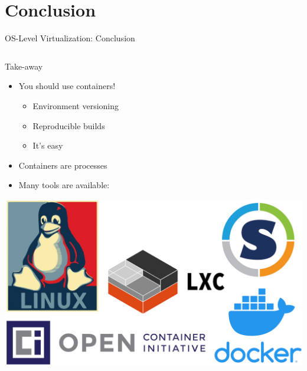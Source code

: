 \documentclass[10pt, compress, aspectratio=169, xcolor={table,usenames,dvipsnames}]{beamer}
\begin{document}
\section{Conclusion}
\label{sec:org249d7a5}
\begin{frame}[label={sec:org422efed}]{OS-Level Virtualization: Conclusion}
\begin{columns}
\begin{column}{0.4\columnwidth}
\begin{block}{Take-away}
\begin{itemize}
\item You should \alert{use containers}!
\begin{itemize}
\item Environment versioning
\item Reproducible builds
\item It's \alert{easy}
\end{itemize}
\item Containers are \alert{processes}
\item Many \alert{tools} are available:
\end{itemize}

\begin{center}
\includegraphics[width=.8\columnwidth]{../../img/containers.jpg}
\end{center}
\end{block}
\end{column}


\end{columns}
\end{frame}
\end{document}
